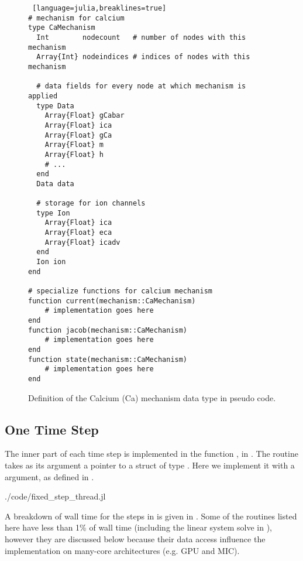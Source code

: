 \begin{figure}[htp!]
\begin{shaded}
\begin{lstlisting} [language=julia,breaklines=true]
# mechanism for calcium
type CaMechanism
  Int        nodecount   # number of nodes with this mechanism
  Array{Int} nodeindices # indices of nodes with this mechanism

  # data fields for every node at which mechanism is applied
  type Data
    Array{Float} gCabar
    Array{Float} ica
    Array{Float} gCa
    Array{Float} m
    Array{Float} h
    # ...
  end
  Data data

  # storage for ion channels
  type Ion
    Array{Float} ica
    Array{Float} eca
    Array{Float} icadv
  end
  Ion ion
end

# specialize functions for calcium mechanism
function current(mechanism::CaMechanism)
    # implementation goes here
end
function jacob(mechanism::CaMechanism)
    # implementation goes here
end
function state(mechanism::CaMechanism)
    # implementation goes here
end
\end{lstlisting}
\end{shaded}
\caption{Definition of the Calcium (Ca) mechanism data type in pseudo code.}
\label{fig:CaMechanism}
\end{figure}

\clearpage
\subsection{One Time Step}
The inner part of each time step is implemented in the function , in . The routine takes as its argument a pointer to a struct of type . Here we implement it with a  argument, as defined in .


\begin{shaded}
 {./code/fixed_step_thread.jl}
\end{shaded}

A breakdown of wall time for the steps in  is given in . Some of the routines listed here have less than 1\% of wall time (including the linear system solve in ), however they are discussed below because their data access influence the implementation on many-core architectures (e.g. GPU and MIC).
